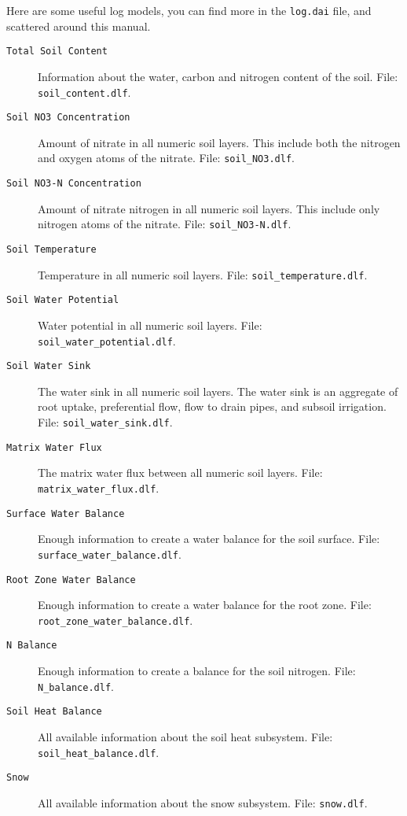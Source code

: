 \documentclass[a4paper,11pt]{article}
\begin{document}
Here are some useful log models, you can find more in the
\texttt{log.dai} file, and scattered around this manual.
\begin{description}
\item[\texttt{Total Soil Content}] Information about the water, carbon
  and nitrogen content of the soil.  File: \texttt{soil\_content.dlf}.
\item[\texttt{Soil NO3 Concentration}] Amount of nitrate in all
  numeric soil layers.  This include both the nitrogen and oxygen
  atoms of the nitrate.  File: \texttt{soil\_NO3.dlf}.
\item[\texttt{Soil NO3-N Concentration}] Amount of nitrate nitrogen in
  all numeric soil layers.  This include only nitrogen atoms of the
  nitrate.  File: \texttt{soil\_NO3-N.dlf}.
\item[\texttt{Soil Temperature}] Temperature in all numeric soil
  layers. File: \texttt{soil\_temperature.dlf}.
\item[\texttt{Soil Water Potential}] Water potential in all numeric
  soil layers.  File: \texttt{soil\_water\_potential.dlf}.
\item[\texttt{Soil Water Sink}] The water sink in all numeric soil
  layers.  The water sink is an aggregate of root uptake, preferential
  flow, flow to drain pipes, and subsoil irrigation.  File:
  \texttt{soil\_water\_sink.dlf}.
\item[\texttt{Matrix Water Flux}] The matrix water flux between all
  numeric soil layers.  File: \texttt{matrix\_water\_flux.dlf}.
\item[\texttt{Surface Water Balance}] Enough information to create a
  water balance for the soil surface.  File:
  \texttt{surface\_water\_balance.dlf}.
\item[\texttt{Root Zone Water Balance}] Enough information to create a
  water balance for the root zone.  File:
  \texttt{root\_zone\_water\_balance.dlf}. 
\item[\texttt{N Balance}] Enough information to create a balance for
  the soil nitrogen.  File: \texttt{N\_balance.dlf}.
\item[\texttt{Soil Heat Balance}] All available information about the
  soil heat subsystem.  File: \texttt{soil\_heat\_balance.dlf}.
\item[\texttt{Snow}] All available information about the snow
  subsystem.  File: \texttt{snow.dlf}.
\end{description}
\end{document}
